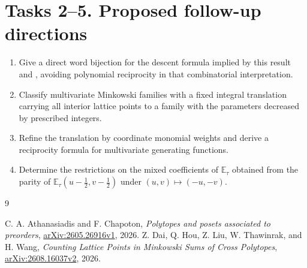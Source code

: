 \documentclass[11pt]{article}
\newcommand{\E}{\mathbb E}
\begin{document}
\section*{Tasks 2--5. Proposed follow-up directions}
\begin{enumerate}[label=\textbf{Task \arabic*.},start=2,leftmargin=*]
\item Give a direct word bijection for the descent formula implied
by this result and \cite[Remark 7.3]{AC}, avoiding polynomial
reciprocity in that combinatorial interpretation.
\item Classify multivariate Minkowski families with a fixed integral
translation carrying all interior lattice points to a family with
the parameters decreased by prescribed integers.
\item Refine the translation by coordinate monomial weights and
derive a reciprocity formula for multivariate generating functions.
\item Determine the restrictions on the mixed coefficients of
$\E_\tau$ obtained from the parity of
$\E_\tau(u-\tfrac12,v-\tfrac12)$ under $(u,v)\mapsto(-u,-v)$.
\end{enumerate}
\begin{thebibliography}{9}
\raggedright
{} C. A. Athanasiadis and F. Chapoton,
\emph{Polytopes and posets associated to preorders},
\href{https://arxiv.org/abs/2605.26916v1}{arXiv:2605.26916v1}, 2026.
 Z. Dai, Q. Hou, Z. Liu, W. Thawinrak, and H. Wang,
\emph{Counting Lattice Points in Minkowski Sums of Cross Polytopes},
\href{https://arxiv.org/abs/2608.16037v2}{arXiv:2608.16037v2}, 2026.
\end{thebibliography}
\end{document}
